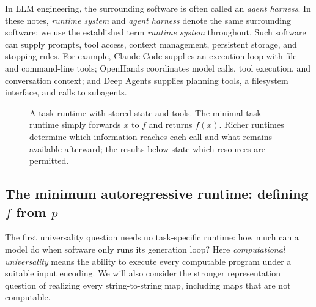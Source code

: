 \documentclass[11pt,twoside]{article}
\theoremstyle{definition}
\theoremstyle{remark}
\begin{document}
In LLM engineering, the surrounding software is often called an
\emph{agent harness}. In these notes, \emph{runtime system} and
\emph{agent harness} denote the same surrounding software; we use the
established term \emph{runtime system} throughout. Such software can supply
prompts, tool access, context
management, persistent storage, and stopping rules. For example,
Claude Code supplies an execution loop with file and command-line tools;
OpenHands coordinates model calls, tool execution, and conversation
context; and Deep Agents supplies planning tools, a filesystem interface,
and calls to subagents.

\begin{figure}[htbp]
\centering
{}
\caption{A task runtime with stored state and tools. The minimal task
runtime simply forwards $x$ to $f$ and returns $f(x)$. Richer runtimes
determine which information reaches each call and what remains available
afterward; the results below state which resources are permitted.}
\label{fig:system}
\end{figure}

\subsection{The minimum autoregressive runtime: defining \texorpdfstring{$f$}{f} from \texorpdfstring{$p$}{p}}
\label{sec:generation-runtime}

The first universality question needs no task-specific runtime: how much
can a model do when software only runs its generation loop? Here
\emph{computational universality} means the ability to execute every
computable program under a suitable input encoding. We will also consider
the stronger representation question of realizing every string-to-string
map, including maps that are not computable.
\end{document}

